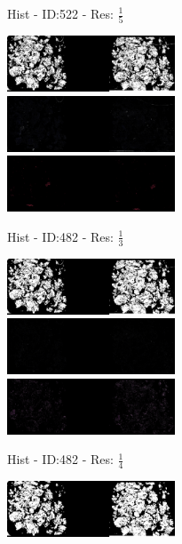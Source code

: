 \documentclass[a4paper,10pt,oneside]{article}
\begin{document}
\begin{figure}[hbtp]
\begin{subfigure}[b]{5cm}
    \caption{Hist - ID:522 - Res: $\frac{1}{5}$}
  \end{subfigure}
  \begin{subfigure}[b]{5cm}
    \includegraphics[width=5cm]{visualization/results/histogramSeg/res_reduce_3/Region_0_PO14-00482B3_1_2_201404171123.png}
    \includegraphics[width=5cm]{visualization/results/histogramSeg/res_reduce_3/Region_1_PO14-00482B3_1_2_201404171123.png}
    \includegraphics[width=5cm]{visualization/results/histogramSeg/res_reduce_3/Region_2_PO14-00482B3_1_2_201404171123.png}
    \caption{Hist - ID:482 - Res: $\frac{1}{3}$}
  \end{subfigure}
  \begin{subfigure}[b]{5cm}
    \includegraphics[width=5cm]{visualization/results/histogramSeg/res_reduce_4/Region_0_PO14-00482B3_1_2_201404171123.png}
    \includegraphics[width=5cm]{visualization/results/histogramSeg/res_reduce_4/Region_1_PO14-00482B3_1_2_201404171123.png}
    \includegraphics[width=5cm]{visualization/results/histogramSeg/res_reduce_4/Region_2_PO14-00482B3_1_2_201404171123.png}
    \caption{Hist - ID:482 - Res: $\frac{1}{4}$}
  \end{subfigure}
  \begin{subfigure}[b]{5cm}
    \includegraphics[width=5cm]{visualization/results/histogramSeg/res_reduce_5/Region_0_PO14-00482B3_1_2_201404171123.png}

\end{subfigure}
\end{figure}
\end{document}
